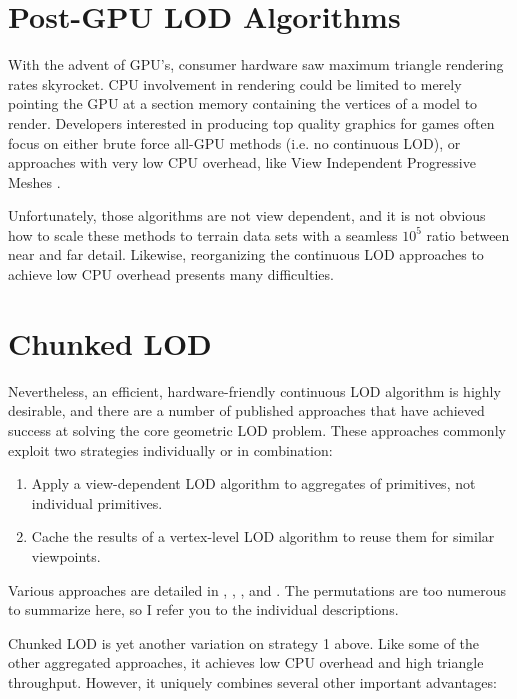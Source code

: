 \documentclass[12pt]{article}
\begin{document}
\section{Post-GPU LOD Algorithms}

With the advent of GPU's, consumer hardware saw maximum triangle
rendering rates skyrocket.  CPU involvement in rendering could be
limited to merely pointing the GPU at a section memory containing the
vertices of a model to render.  Developers interested in producing top
quality graphics for games often focus on either brute force all-GPU
methods (i.e. no continuous LOD), or approaches with very low CPU
overhead, like View Independent Progressive Meshes
\cite{bloom}\cite{svarovsky}.
 
Unfortunately, those algorithms are not view dependent, and it is not
obvious how to scale these methods to terrain data sets with a
seamless $10^5$ ratio between near and far detail.  Likewise,
reorganizing the continuous LOD approaches to achieve low CPU overhead
presents many difficulties.
 
\section{Chunked LOD}

Nevertheless, an efficient, hardware-friendly continuous LOD algorithm
is highly desirable, and there are a number of published approaches
that have achieved success at solving the core geometric LOD problem.
These approaches commonly exploit two strategies individually or in
combination:
 
\begin{enumerate}
\item Apply a view-dependent LOD algorithm to aggregates of
primitives, not individual primitives.

\item Cache the results of a vertex-level LOD algorithm to reuse them
for similar viewpoints.
\end{enumerate}

Various approaches are detailed in \cite{deboer}, \cite{bloom},
\cite{cline}, \cite{levenberg} and \cite{pomeranz}.  The permutations
are too numerous to summarize here, so I refer you to the individual
descriptions.
 
Chunked LOD is yet another variation on strategy 1 above.  Like some
of the other aggregated approaches, it achieves low CPU overhead and
high triangle throughput.  However, it uniquely combines several
other important advantages:
\end{document}
